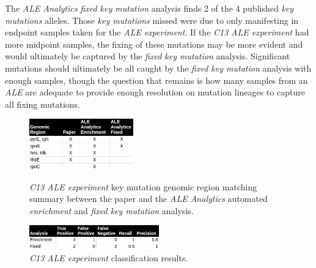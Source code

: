 \documentclass[12pt,final,masters,chapterheads]{ucsd}  %
\newcommand\todo[1]{\textcolor{red}{#1}}
\begin{document}
The \textit{ALE Analytics} \textit{fixed key mutation} analysis finds 2 of the 4 published \textit{key mutations} alleles. Those \textit{key mutations} missed were due to only manifesting in endpoint samples taken for the \textit{ALE experiment}. If the \textit{C13} \textit{ALE experiment} had more midpoint samples, the fixing of these mutations may be more evident and would ultimately be captured by the \textit{fixed key mutation} analysis. Significant mutations should ultimately be all caught by the \textit{fixed key mutation} analysis with enough samples, though the question that remains is how many samples from an \textit{ALE} are adequate to provide enough resolution on mutation lineages to capture all fixing mutations.
\begin{figure}[H]
  \caption{\textit{C13} \textit{ALE experiment} {key mutation} genomic region matching summary between the paper and the \textit{ALE Analytics} automated \textit{enrichment} and \textit{fixed key mutation} analysis.}
  \centering
  \includegraphics[width=0.4\textwidth]{c13_key_mutation_regions.png}
  \label{fig:}
\end{figure}
\begin{figure}[H]
  \centering
   \caption{\textit{C13} \textit{ALE experiment} classification results.}
  \includegraphics[width=0.5\textwidth]{c13_precision_recall.png}
\end{figure}
\end{document}
